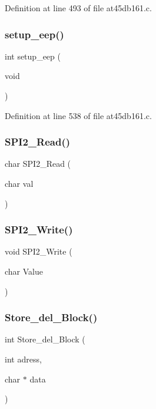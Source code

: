 Definition at line 493 of file at45db161.\+c.

\mbox{\label{at45db161_8c_a67abee2196250891a8788506aa631db5}} 
\subsubsection{setup\+\_\+eep()}
{\footnotesize\ttfamily int setup\+\_\+eep (\begin{DoxyParamCaption}\item[{void}]{ }\end{DoxyParamCaption})}



Definition at line 538 of file at45db161.\+c.

\mbox{\label{at45db161_8c_a2990f27b6697a9465954c15b59b931e4}} 
\subsubsection{S\+P\+I2\+\_\+\+Read()}
{\footnotesize\ttfamily char S\+P\+I2\+\_\+\+Read (\begin{DoxyParamCaption}\item[{char}]{val }\end{DoxyParamCaption})}

\mbox{\label{at45db161_8c_ab33cddad4fe5efd8d464ed3a35da7d7e}} 
\subsubsection{S\+P\+I2\+\_\+\+Write()}
{\footnotesize\ttfamily void S\+P\+I2\+\_\+\+Write (\begin{DoxyParamCaption}\item[{char}]{Value }\end{DoxyParamCaption})}

\mbox{\label{at45db161_8c_aae298893ab10764fb9339cadc82422b8}} 
\subsubsection{Store\+\_\+del\+\_\+\+Block()}
{\footnotesize\ttfamily int Store\+\_\+del\+\_\+\+Block (\begin{DoxyParamCaption}\item[{int}]{adress,  }\item[{char $\ast$}]{data }\end{DoxyParamCaption})}



